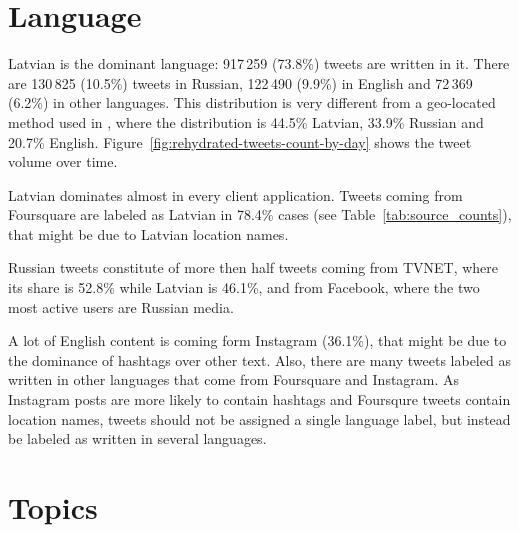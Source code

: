 \documentclass{IOS-Book-Article}
\newcommand{\hl}[1]{#1}
\begin{document}
\section{Language}
\label{sec:language}



Latvian is the dominant language: \hl{917\,259 (73.8\%)} tweets are written in it.\footnotemark{} There are \hl{130\,825 (10.5\%)} tweets in Russian, \hl{122\,490 (9.9\%)} in English and \hl{72\,369\, (6.2\%)} in other languages. This distribution is very different from a geo-located method used in \cite{milajevs:2017:BUCC}, where the distribution is 44.5\% Latvian, 33.9\% Russian and 20.7\% English. Figure~\ref{fig:rehydrated-tweets-count-by-day} shows the tweet volume over time.


Latvian dominates almost in every client application. Tweets coming from Foursquare are labeled as Latvian in \hl{78.4\%} cases (see Table~\ref{tab:source_counts}), that might be due to Latvian location names.

Russian tweets constitute of more then half tweets coming from TVNET, where its share is \hl{52.8\%} while Latvian is \hl{46.1\%}, and from Facebook, where the two most active users are Russian media.

A lot of English content is coming form Instagram (\hl{36.1\%}), that might be due to the dominance of hashtags over other text. Also, there are many tweets labeled as written in other languages that come from Foursquare and Instagram. As Instagram posts are more likely to contain hashtags and Foursqure tweets contain location names, tweets should not be assigned a single language label, but instead be labeled as written in several languages.



\section{Topics}
\label{sec:topics}
\end{document}
